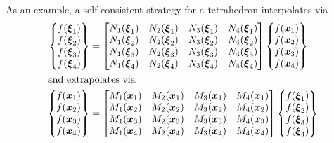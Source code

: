 As an example, a self-consistent strategy for a tetrahedron interpolates via
\begin{subequations}
    \begin{align}
    \left\{ \begin{matrix}
    f ( \boldsymbol{\xi}_1 ) \\ 
    f ( \boldsymbol{\xi}_2 ) \\ 
    f ( \boldsymbol{\xi}_3 ) \\ 
    f ( \boldsymbol{\xi}_4 )
    \end{matrix} \right\} & = \begin{bmatrix}
    N_1 (\boldsymbol{\xi}_1) & N_2 (\boldsymbol{\xi}_1) & 
    N_3 (\boldsymbol{\xi}_1) & N_4 (\boldsymbol{\xi}_1) \\
    N_1 (\boldsymbol{\xi}_2) & N_2 (\boldsymbol{\xi}_2) &
    N_3 (\boldsymbol{\xi}_2) & N_4 (\boldsymbol{\xi}_2) \\
    N_1 (\boldsymbol{\xi}_3) & N_2 (\boldsymbol{\xi}_3) & 
    N_3 (\boldsymbol{\xi}_3) & N_4 (\boldsymbol{\xi}_3) \\
    N_1 (\boldsymbol{\xi}_4) & N_2 (\boldsymbol{\xi}_4) & 
    N_3 (\boldsymbol{\xi}_4) & N_4 (\boldsymbol{\xi}_4)
    \end{bmatrix} \left\{ \begin{matrix} 
    f ( \boldsymbol{x}_1 ) \\ 
    f ( \boldsymbol{x}_2 ) \\ 
    f ( \boldsymbol{x}_3 ) \\
    f ( \boldsymbol{x}_4 ) 
    \end{matrix} \right\}
    \notag \\ 
    \intertext{and extrapolates via}
    \left\{ \begin{matrix} 
    f ( \boldsymbol{x}_1 ) \\ 
    f ( \boldsymbol{x}_2 ) \\ 
    f ( \boldsymbol{x}_3 ) \\
    f ( \boldsymbol{x}_4 )
    \end{matrix} \right\} & = \begin{bmatrix}
    M_1 (\boldsymbol{x}_1) & M_2 (\boldsymbol{x}_1) & 
    M_3 (\boldsymbol{x}_1) & M_4 (\boldsymbol{x}_1) \\
    M_1 (\boldsymbol{x}_2) & M_2 (\boldsymbol{x}_2) &
    M_3 (\boldsymbol{x}_2) & M_4 (\boldsymbol{x}_2) \\
    M_1 (\boldsymbol{x}_3) & M_2 (\boldsymbol{x}_3) & 
    M_3 (\boldsymbol{x}_3) & M_4 (\boldsymbol{x}_3) \\
    M_1 (\boldsymbol{x}_4) & M_2 (\boldsymbol{x}_4) & 
    M_3 (\boldsymbol{x}_4) & M_4 (\boldsymbol{x}_4)
    \end{bmatrix} \left\{ \begin{matrix}
    f ( \boldsymbol{\xi}_1 ) \\ 
    f ( \boldsymbol{\xi}_2 ) \\ 
    f ( \boldsymbol{\xi}_3 ) \\ 
    f ( \boldsymbol{\xi}_4 )
    \end{matrix} \right\}
    \notag
    \end{align}
\end{subequations}
